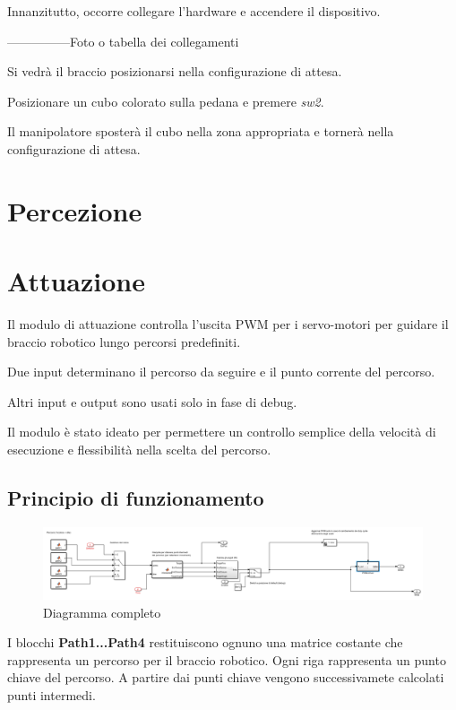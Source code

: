 \documentclass[12pt]{report}
\begin{document}
Innanzitutto, occorre collegare l'hardware e accendere il dispositivo.

---------------Foto o tabella dei collegamenti

Si vedrà il braccio posizionarsi nella configurazione di attesa.

Posizionare un cubo colorato sulla pedana e premere \emph{sw2}.

Il manipolatore sposterà il cubo nella zona appropriata e tornerà nella configurazione di attesa.

\chapter{Percezione}


\chapter{Attuazione}

Il modulo di attuazione controlla l'uscita PWM per i servo-motori per guidare il braccio robotico lungo percorsi predefiniti.

Due input determinano il percorso da seguire e il punto corrente del percorso.

Altri input e output sono usati solo in fase di debug.

Il modulo è stato ideato per permettere un controllo semplice della velocità di esecuzione e flessibilità nella scelta del percorso.

\section{Principio di funzionamento}

\begin{figure}
\includegraphics[width=\textwidth]{Complete_attuation}
\caption{Diagramma completo}
\end{figure}

I blocchi \textbf{Path1...Path4} restituiscono ognuno una matrice costante che rappresenta un percorso per il braccio robotico. Ogni riga rappresenta un punto chiave del percorso. A partire dai punti chiave vengono successivamete calcolati punti intermedi.
\end{document}

